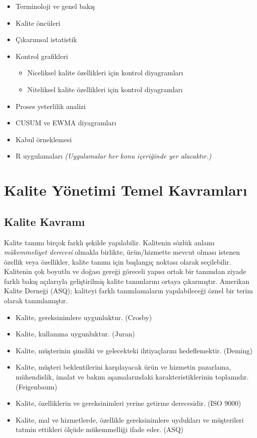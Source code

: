 \documentclass[
]{book}
\providecommand{\tightlist}{%
  \setlength{\itemsep}{0pt}\setlength{\parskip}{0pt}}
\begin{document}
\begin{itemize}
\item
  Terminoloji ve genel bakış
\item
  Kalite öncüleri
\item
  Çıkarımsal istatistik
\item
  Kontrol grafikleri

  \begin{itemize}
  \tightlist
  \item
    Niceliksel kalite özellikleri için kontrol diyagramları
  \item
    Niteliksel kalite özellikleri için kontrol diyagramları
  \end{itemize}
\item
  Proses yeterlilik analizi
\item
  CUSUM ve EWMA diyagramları
\item
  Kabul örneklemesi
\item
  R uygulamaları \emph{(Uygulamalar her konu içeriğinde yer alacaktır.)}
\end{itemize}

\hypertarget{kalite-yuxf6netimi-temel-kavramlarux131}{%
\chapter{Kalite Yönetimi Temel Kavramları}\label{kalite-yuxf6netimi-temel-kavramlarux131}}

\hypertarget{kalite-kavramux131}{%
\section{Kalite Kavramı}\label{kalite-kavramux131}}

Kalite tanımı birçok farklı şekilde yapılabilir. Kalitenin sözlük anlamı \emph{mükemmeliyet derecesi} olmakla birlikte, ürün/hizmette mevcut olması istenen özellik veya özellikler, kalite tanımı için başlangıç noktası olarak seçilebilir. Kalitenin çok boyutlu ve doğası gereği göreceli yapısı ortak bir tanımdan ziyade farklı bakış açılarıyla geliştirilmiş kalite tanımlarını ortaya çıkarmıştır. Amerikan Kalite Derneği (ASQ); kaliteyi farklı tanımlamaların yapılabileceği öznel bir terim olarak tanımlamıştır.

\begin{itemize}
\tightlist
\item
  Kalite, gereksinimlere uygunluktur. (Crosby)
\item
  Kalite, kullanıma uygunluktur. (Juran)
\item
  Kalite, müşterinin şimdiki ve gelecekteki ihtiyaçlarını hedeflemektir. (Deming)
\item
  Kalite, müşteri beklentilerini karşılayacak ürün ve hizmetin pazarlama, mühendislik, imalat ve bakım aşamalarındaki karakteristiklerinin toplamıdır. (Feigenbaum)
\item
  Kalite, özelliklerin ve gereksinimleri yerine getirme derecesidir. (ISO 9000)
\item
  Kalite, mal ve hizmetlerde, özellikle gereksinimlere uydukları ve müşterileri tatmin ettikleri ölçüde mükemmelliği ifade eder. (ASQ)
\end{itemize}
\end{document}
